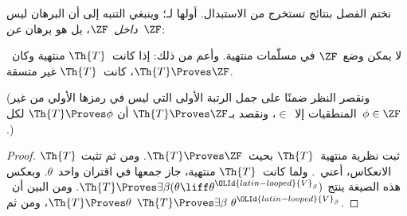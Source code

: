 \documentclass[../../../include/open-logic-section]{subfiles}
\begin{document}
	
نختم الفصل بنتائج تستخرج من الاستبدال. أولها لـ\citet{Montague1961}؛
وينبغي التنبه إلى أن البرهان ليس \emph{داخل}~$\ZF$، بل هو برهان
\emph{عن}~$\ZF$:
\begin{thm}
	لا يمكن وضع~$\ZF$ في مسلّمات منتهية. وأعم من ذلك: إذا كانت~$\Th{T}$
	منتهية وكان~$\Th{T} \Proves \ZF$، كانت~$\Th{T}$ غير متسقة.
	
	(ونقصر النظر ضمنًا على جمل الرتبة الأولى التي ليس في رمزها الأولي
	من غير المنطقيات إلا~$\in$، ونقصد بـ$\Th{T} \Proves \ZF$ أن
	$\Th{T} \Proves \phi$ لكل~$\phi \in \ZF$.)
\end{thm}
\begin{proof}
	ثبت نظرية منتهية~$\Th{T}$ بحيث~$\Th{T} \Proves \ZF$. ومن ثم تثبت
	$\Th{T}$ الانعكاس، أعني~.
	ولما كانت~$\Th{T}$ منتهية، جاز جمعها في اقتران واحد~$\theta$.
	وبعكس هذه الصيغة ينتج
	$\Th{T} \Proves \exists \beta(\theta \liff \theta^{\OLId{latin-looped}{V}_\beta})$.
	ومن البين أن~$\Th{T} \Proves \theta$، ومن ثم
	$\Th{T} \Proves \exists \beta\ \theta^{\OLId{latin-looped}{V}_\beta}$.
	

\end{proof}
\end{document}
